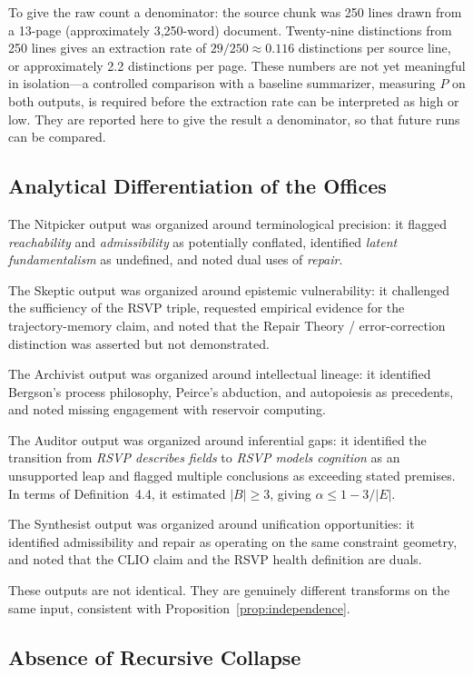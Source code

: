 \documentclass[12pt, a4paper]{article}
\theoremstyle{principle}
\theoremstyle{definition}
\begin{document}
To give the raw count a denominator: the source chunk was 250 lines drawn from a
13-page (approximately 3,250-word) document. Twenty-nine distinctions from 250 lines
gives an extraction rate of $29 / 250 \approx 0.116$ distinctions per source line,
or approximately 2.2 distinctions per page. These numbers are not yet meaningful in
isolation---a controlled comparison with a baseline summarizer, measuring $P$ on
both outputs, is required before the extraction rate can be interpreted as high or
low. They are reported here to give the result a denominator, so that future runs
can be compared.

\subsection{Analytical Differentiation of the Offices}

The Nitpicker output was organized around terminological precision: it flagged
\emph{reachability} and \emph{admissibility} as potentially conflated, identified
\emph{latent fundamentalism} as undefined, and noted dual uses of \emph{repair}.

The Skeptic output was organized around epistemic vulnerability: it challenged the
sufficiency of the RSVP triple, requested empirical evidence for the
trajectory-memory claim, and noted that the Repair Theory / error-correction
distinction was asserted but not demonstrated.

The Archivist output was organized around intellectual lineage: it identified
Bergson's process philosophy, Peirce's abduction, and autopoiesis as precedents,
and noted missing engagement with reservoir computing.

The Auditor output was organized around inferential gaps: it identified the
transition from \emph{RSVP describes fields} to \emph{RSVP models cognition} as
an unsupported leap and flagged multiple conclusions as exceeding stated premises.
In terms of Definition~4.4, it estimated $|B| \geq 3$, giving $\alpha \leq 1 - 3/|E|$.

The Synthesist output was organized around unification opportunities: it identified
admissibility and repair as operating on the same constraint geometry, and noted
that the CLIO claim and the RSVP health definition are duals.

These outputs are not identical. They are genuinely different transforms on the same
input, consistent with Proposition~\ref{prop:independence}.

\subsection{Absence of Recursive Collapse}
\end{document}
